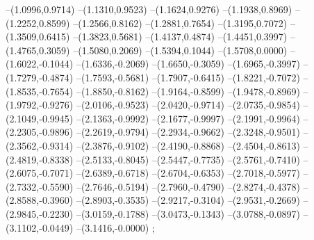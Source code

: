 {--(1.0996,0.9714)
--(1.1310,0.9523)
--(1.1624,0.9276)
--(1.1938,0.8969)
--(1.2252,0.8599)
--(1.2566,0.8162)
--(1.2881,0.7654)
--(1.3195,0.7072)
--(1.3509,0.6415)
--(1.3823,0.5681)
--(1.4137,0.4874)
--(1.4451,0.3997)
--(1.4765,0.3059)
--(1.5080,0.2069)
--(1.5394,0.1044)
--(1.5708,0.0000)
--(1.6022,-0.1044)
--(1.6336,-0.2069)
--(1.6650,-0.3059)
--(1.6965,-0.3997)
--(1.7279,-0.4874)
--(1.7593,-0.5681)
--(1.7907,-0.6415)
--(1.8221,-0.7072)
--(1.8535,-0.7654)
--(1.8850,-0.8162)
--(1.9164,-0.8599)
--(1.9478,-0.8969)
--(1.9792,-0.9276)
--(2.0106,-0.9523)
--(2.0420,-0.9714)
--(2.0735,-0.9854)
--(2.1049,-0.9945)
--(2.1363,-0.9992)
--(2.1677,-0.9997)
--(2.1991,-0.9964)
--(2.2305,-0.9896)
--(2.2619,-0.9794)
--(2.2934,-0.9662)
--(2.3248,-0.9501)
--(2.3562,-0.9314)
--(2.3876,-0.9102)
--(2.4190,-0.8868)
--(2.4504,-0.8613)
--(2.4819,-0.8338)
--(2.5133,-0.8045)
--(2.5447,-0.7735)
--(2.5761,-0.7410)
--(2.6075,-0.7071)
--(2.6389,-0.6718)
--(2.6704,-0.6353)
--(2.7018,-0.5977)
--(2.7332,-0.5590)
--(2.7646,-0.5194)
--(2.7960,-0.4790)
--(2.8274,-0.4378)
--(2.8588,-0.3960)
--(2.8903,-0.3535)
--(2.9217,-0.3104)
--(2.9531,-0.2669)
--(2.9845,-0.2230)
--(3.0159,-0.1788)
--(3.0473,-0.1343)
--(3.0788,-0.0897)
--(3.1102,-0.0449)
--(3.1416,-0.0000)
;}
